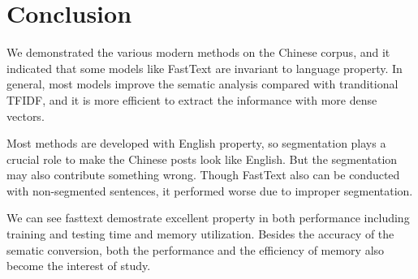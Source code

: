 \section{Conclusion}

We demonstrated the various modern methods on the Chinese corpus, and it indicated that some models like FastText are invariant to language property. 
In general, most models improve the sematic analysis compared with tranditional TFIDF, and it is more efficient to extract the informance with more dense vectors.

Most methods are developed with English property, so segmentation plays a crucial role to make the Chinese posts look like English.
 But the segmentation may also contribute something wrong. Though FastText also can be conducted with non-segmented sentences, it performed worse due to improper segmentation.

We can see fasttext demostrate excellent property in both performance including training and testing time and memory utilization. 
Besides the accuracy of the sematic conversion, both the performance and the efficiency of memory also become the interest of study.

